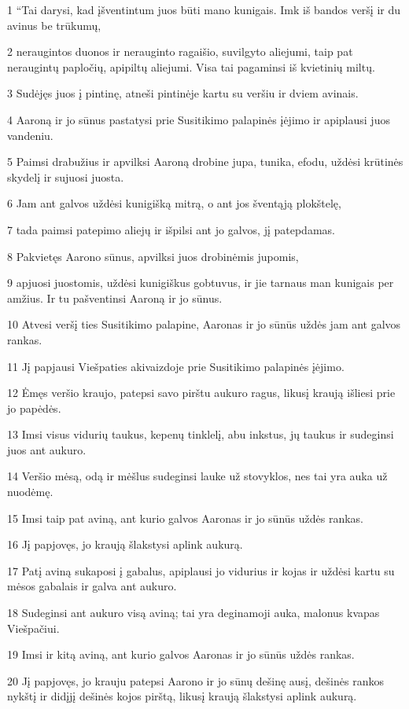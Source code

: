 \par 1 “Tai darysi, kad įšventintum juos būti mano kunigais. Imk iš bandos veršį ir du avinus be trūkumų, 
\par 2 neraugintos duonos ir nerauginto ragaišio, suvilgyto aliejumi, taip pat neraugintų papločių, apipiltų aliejumi. Visa tai pagaminsi iš kvietinių miltų. 
\par 3 Sudėjęs juos į pintinę, atneši pintinėje kartu su veršiu ir dviem avinais. 
\par 4 Aaroną ir jo sūnus pastatysi prie Susitikimo palapinės įėjimo ir apiplausi juos vandeniu. 
\par 5 Paimsi drabužius ir apvilksi Aaroną drobine jupa, tunika, efodu, uždėsi krūtinės skydelį ir sujuosi juosta. 
\par 6 Jam ant galvos uždėsi kunigišką mitrą, o ant jos šventąją plokštelę, 
\par 7 tada paimsi patepimo aliejų ir išpilsi ant jo galvos, jį patepdamas. 
\par 8 Pakvietęs Aarono sūnus, apvilksi juos drobinėmis jupomis, 
\par 9 apjuosi juostomis, uždėsi kunigiškus gobtuvus, ir jie tarnaus man kunigais per amžius. Ir tu pašventinsi Aaroną ir jo sūnus. 
\par 10 Atvesi veršį ties Susitikimo palapine, Aaronas ir jo sūnūs uždės jam ant galvos rankas. 
\par 11 Jį papjausi Viešpaties akivaizdoje prie Susitikimo palapinės įėjimo. 
\par 12 Ėmęs veršio kraujo, patepsi savo pirštu aukuro ragus, likusį kraują išliesi prie jo papėdės. 
\par 13 Imsi visus vidurių taukus, kepenų tinklelį, abu inkstus, jų taukus ir sudeginsi juos ant aukuro. 
\par 14 Veršio mėsą, odą ir mėšlus sudeginsi lauke už stovyklos, nes tai yra auka už nuodėmę. 
\par 15 Imsi taip pat aviną, ant kurio galvos Aaronas ir jo sūnūs uždės rankas. 
\par 16 Jį papjovęs, jo kraują šlakstysi aplink aukurą. 
\par 17 Patį aviną sukaposi į gabalus, apiplausi jo vidurius ir kojas ir uždėsi kartu su mėsos gabalais ir galva ant aukuro. 
\par 18 Sudeginsi ant aukuro visą aviną; tai yra deginamoji auka, malonus kvapas Viešpačiui. 
\par 19 Imsi ir kitą aviną, ant kurio galvos Aaronas ir jo sūnūs uždės rankas. 
\par 20 Jį papjovęs, jo krauju patepsi Aarono ir jo sūnų dešinę ausį, dešinės rankos nykštį ir didįjį dešinės kojos pirštą, likusį kraują šlakstysi aplink aukurą. 

